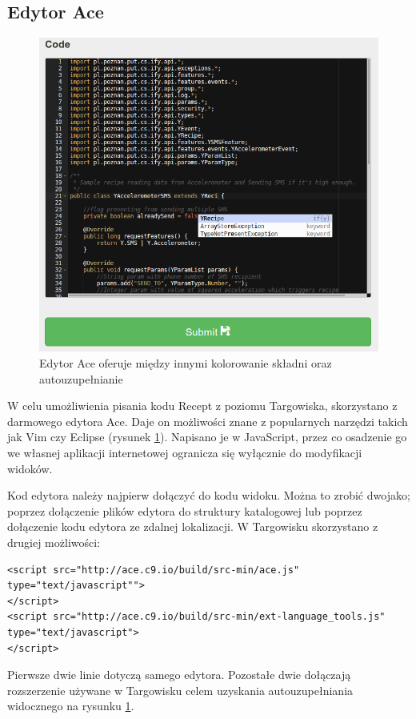 \documentclass[11pt,a4paper,polish,thesis]{dcsbook}
\begin{document}
\subsection{Edytor Ace}
\begin{figure}[p]
  \centering
  \includegraphics[scale=0.6]{./resources/market_ace.png}
  \caption{Edytor Ace oferuje między innymi kolorowanie składni oraz autouzupełnianie}
  \label{fig:market_ace}
\end{figure}
W celu umożliwienia pisania kodu Recept z poziomu Targowiska, skorzystano z darmowego edytora Ace. Daje on możliwości znane z popularnych narzędzi
takich jak Vim czy Eclipse (rysunek \ref{fig:market_ace}). Napisano je w JavaScript, przez co osadzenie go we własnej aplikacji internetowej ogranicza się wyłącznie
do modyfikacji widoków.

Kod edytora należy najpierw dołączyć do kodu widoku. Można to zrobić dwojako; poprzez dołączenie plików edytora do struktury katalogowej lub poprzez dołączenie kodu
edytora ze zdalnej lokalizacji. W Targowisku skorzystano z drugiej możliwości:
\begin{verbatim}
<script src="http://ace.c9.io/build/src-min/ace.js" type="text/javascript"">
</script>
<script src="http://ace.c9.io/build/src-min/ext-language_tools.js" type="text/javascript">
</script>
\end{verbatim}
Pierwsze dwie linie dotyczą samego edytora. Pozostałe dwie dołączają rozszerzenie używane w Targowisku celem uzyskania autouzupełniania widocznego na
rysunku \ref{fig:market_ace}.
\end{document}
